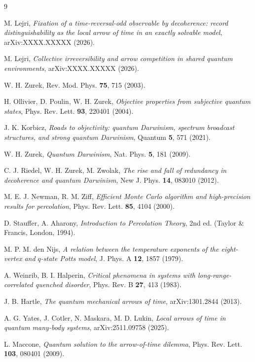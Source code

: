 \documentclass[11pt]{article}
\begin{document}
\begin{thebibliography}{9}

 M. Lejri, \emph{Fixation of a time-reversal-odd observable by
decoherence: record distinguishability as the local arrow of time in an
exactly solvable model}, arXiv:XXXX.XXXXX (2026).

 M. Lejri, \emph{Collective irreversibility and arrow
competition in shared quantum environments}, arXiv:XXXX.XXXXX (2026).

 W. H. Zurek, Rev. Mod. Phys. \textbf{75}, 715 (2003).

 H. Ollivier, D. Poulin, W. H. Zurek, \emph{Objective
properties from subjective quantum states}, Phys. Rev. Lett. \textbf{93},
220401 (2004).

 J. K. Korbicz, \emph{Roads to objectivity: quantum
Darwinism, spectrum broadcast structures, and strong quantum Darwinism},
Quantum \textbf{5}, 571 (2021).

 W. H. Zurek, \emph{Quantum Darwinism}, Nat. Phys.
\textbf{5}, 181 (2009).

 C. J. Riedel, W. H. Zurek, M. Zwolak, \emph{The rise
and fall of redundancy in decoherence and quantum Darwinism}, New J. Phys.
\textbf{14}, 083010 (2012).

 M. E. J. Newman, R. M. Ziff, \emph{Efficient Monte
Carlo algorithm and high-precision results for percolation}, Phys. Rev.
Lett. \textbf{85}, 4104 (2000).

 D. Stauffer, A. Aharony, \emph{Introduction to
Percolation Theory}, 2nd ed. (Taylor \& Francis, London, 1994).

 M. P. M. den Nijs, \emph{A relation between the
temperature exponents of the eight-vertex and $q$-state Potts model}, J.
Phys. A \textbf{12}, 1857 (1979).

 A. Weinrib, B. I. Halperin, \emph{Critical phenomena in
systems with long-range-correlated quenched disorder}, Phys. Rev. B
\textbf{27}, 413 (1983).

 J. B. Hartle, \emph{The quantum mechanical arrows of
time}, arXiv:1301.2844 (2013).

 A. G. Yates, J. Cotler, N. Maskara, M. D. Lukin,
\emph{Local arrows of time in quantum many-body systems}, arXiv:2511.09758
(2025).

 L. Maccone, \emph{Quantum solution to the
arrow-of-time dilemma}, Phys. Rev. Lett. \textbf{103}, 080401 (2009).


\end{thebibliography}
\end{document}
